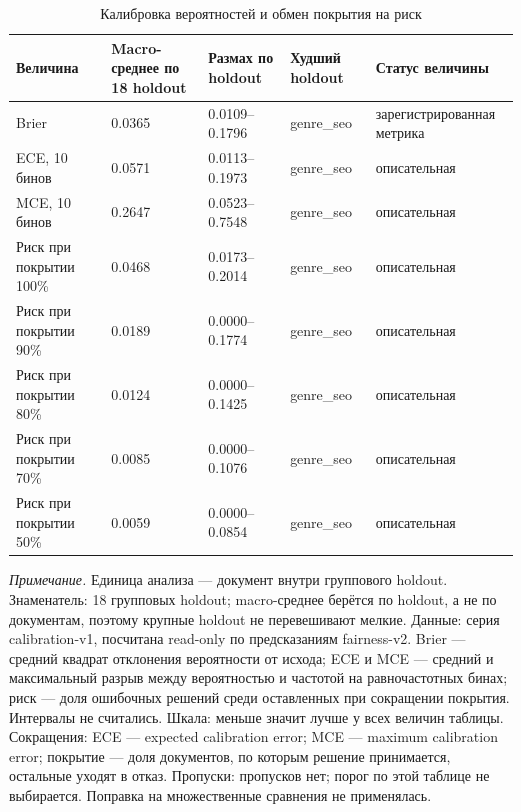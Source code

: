 \begin{table}[htbp]
\centering
\small
\caption{Калибровка вероятностей и обмен покрытия на риск}
\label{tab:6}
\begin{tabular}{lllll}
\toprule
Величина & Macro-среднее по 18 holdout & Размах по holdout & Худший holdout & Статус величины \\
\midrule
Brier & 0.0365 & 0.0109–0.1796 & genre\_seo & зарегистрированная метрика \\
ECE, 10 бинов & 0.0571 & 0.0113–0.1973 & genre\_seo & описательная \\
MCE, 10 бинов & 0.2647 & 0.0523–0.7548 & genre\_seo & описательная \\
Риск при покрытии 100\% & 0.0468 & 0.0173–0.2014 & genre\_seo & описательная \\
Риск при покрытии 90\% & 0.0189 & 0.0000–0.1774 & genre\_seo & описательная \\
Риск при покрытии 80\% & 0.0124 & 0.0000–0.1425 & genre\_seo & описательная \\
Риск при покрытии 70\% & 0.0085 & 0.0000–0.1076 & genre\_seo & описательная \\
Риск при покрытии 50\% & 0.0059 & 0.0000–0.0854 & genre\_seo & описательная \\
\bottomrule
\end{tabular}
\begin{minipage}{\linewidth}\footnotesize\vspace{2pt}
\textit{Примечание.} Единица анализа — документ внутри группового holdout. Знаменатель: 18 групповых holdout; macro-среднее берётся по holdout, а не по документам, поэтому крупные holdout не перевешивают мелкие. Данные: серия calibration-v1, посчитана read-only по предсказаниям fairness-v2. Brier — средний квадрат отклонения вероятности от исхода; ECE и MCE — средний и максимальный разрыв между вероятностью и частотой на равночастотных бинах; риск — доля ошибочных решений среди оставленных при сокращении покрытия. Интервалы не считались. Шкала: меньше значит лучше у всех величин таблицы. Сокращения: ECE — expected calibration error; MCE — maximum calibration error; покрытие — доля документов, по которым решение принимается, остальные уходят в отказ. Пропуски: пропусков нет; порог по этой таблице не выбирается. Поправка на множественные сравнения не применялась.
\end{minipage}
\end{table}
